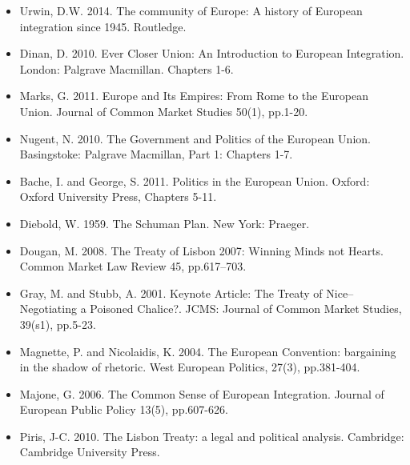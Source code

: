 \begin{itemize}
	\item Urwin, D.W. 2014. The community of Europe: A history of European integration since 1945. Routledge.
	\item Dinan, D. 2010. Ever Closer Union: An Introduction to European Integration. London: Palgrave Macmillan. Chapters 1-6.
	\item Marks, G. 2011. Europe and Its Empires: From Rome to the European Union. Journal of Common Market Studies 50(1), pp.1-20.
	\item Nugent, N. 2010. The Government and Politics of the European Union. Basingstoke: Palgrave Macmillan, Part 1: Chapters 1-7.
	\item Bache, I. and George, S. 2011. Politics in the European Union. Oxford: Oxford University Press, Chapters 5-11.
	\item Diebold, W. 1959. The Schuman Plan. New York: Praeger.
	\item Dougan, M. 2008. The Treaty of Lisbon 2007: Winning Minds not Hearts. Common Market Law Review 45, pp.617–703.
	\item Gray, M. and Stubb, A. 2001. Keynote Article: The Treaty of Nice–Negotiating a Poisoned Chalice?. JCMS: Journal of Common Market Studies, 39(s1), pp.5-23.
	\item Magnette, P. and Nicolaidis, K. 2004. The European Convention: bargaining in the shadow of rhetoric. West European Politics, 27(3), pp.381-404.
	\item Majone, G. 2006. The Common Sense of European Integration. Journal of European Public Policy 13(5), pp.607-626.
	\item Piris, J-C. 2010. The Lisbon Treaty: a legal and political analysis. Cambridge: Cambridge University Press.
\end{itemize}